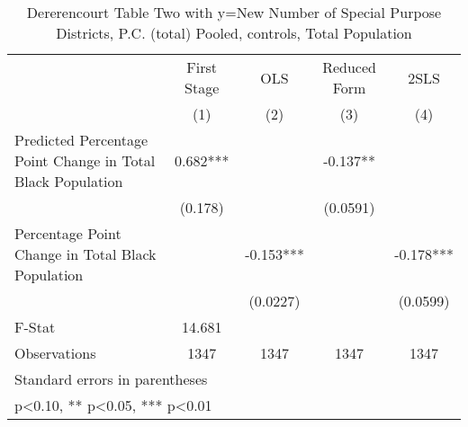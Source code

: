 \begin{table}[htbp]\centering
\def\sym#1{\ifmmode^{#1}\else\(^{#1}\)\fi}
\caption{Dererencourt Table Two with y=New Number of Special Purpose Districts, P.C. (total)  Pooled,  controls, Total Population}
\begin{tabular}{l*{4}{c}}
\toprule
                    & First Stage   &         OLS   &Reduced Form   &        2SLS   \\
                    &\multicolumn{1}{c}{(1)}   &\multicolumn{1}{c}{(2)}   &\multicolumn{1}{c}{(3)}   &\multicolumn{1}{c}{(4)}   \\
\midrule
Predicted Percentage Point Change in Total Black Population&       0.682***&               &      -0.137** &               \\
                    &     (0.178)   &               &    (0.0591)   &               \\
\addlinespace
Percentage Point Change in Total Black Population&               &      -0.153***&               &      -0.178***\\
                    &               &    (0.0227)   &               &    (0.0599)   \\
\midrule
F-Stat              &      14.681   &               &               &               \\
Observations        &        1347   &        1347   &        1347   &        1347   \\
\bottomrule
\multicolumn{5}{l}{\footnotesize Standard errors in parentheses}\\
\multicolumn{5}{l}{\footnotesize * p<0.10, ** p<0.05, *** p<0.01}\\
\end{tabular}
\end{table}
